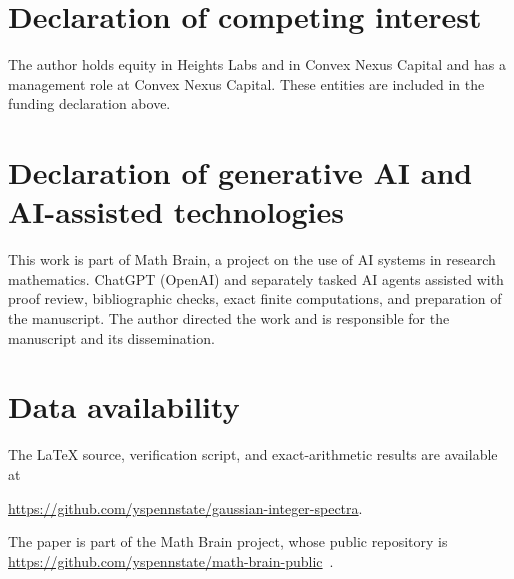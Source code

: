 \documentclass[11pt]{amsart}
\theoremstyle{definition}
\theoremstyle{remark}
\numberwithin{equation}{section}
\begin{document}
\section*{Declaration of competing interest}
The author holds equity in Heights Labs and in Convex Nexus Capital and
has a management role at Convex Nexus Capital. These entities are included
in the funding declaration above.

\section*{Declaration of generative AI and AI-assisted technologies}
This work is part of Math Brain, a project on the use of AI systems in research mathematics. ChatGPT (OpenAI) and separately tasked AI agents assisted with proof review, bibliographic checks, exact finite computations, and preparation of the manuscript. The author directed the work and is responsible for the manuscript and its dissemination.

\section*{Data availability}
The LaTeX source, verification script, and exact-arithmetic results are available at\par
\noindent\url{https://github.com/yspennstate/gaussian-integer-spectra}.

The paper is part of the Math Brain project, whose public repository is \url{https://github.com/yspennstate/math-brain-public}~\cite{MathBrainRepo}.
\end{document}
